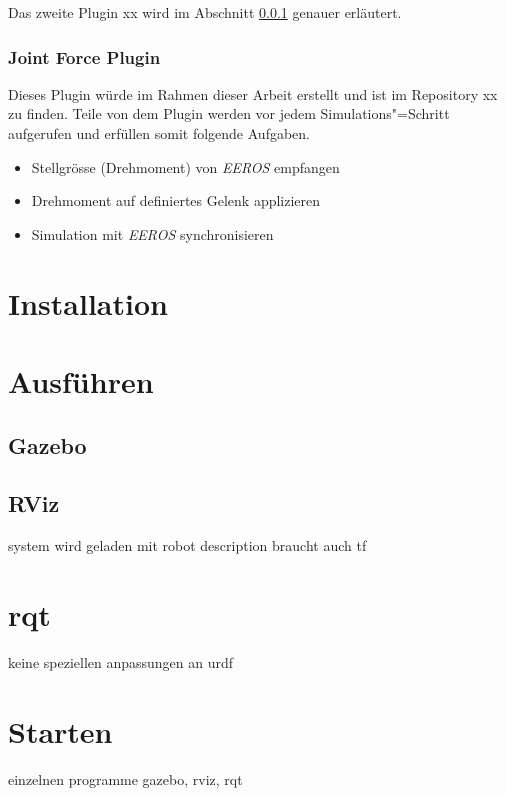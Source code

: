 Das zweite Plugin xx wird im Abschnitt \ref{chap:joint-force-plugin} genauer erläutert.

\subsubsection{Joint Force Plugin}
\label{chap:joint-force-plugin}
Dieses Plugin würde im Rahmen dieser Arbeit erstellt und ist im Repository xx zu finden.
Teile von dem Plugin werden vor jedem Simulations"=Schritt aufgerufen und erfüllen somit folgende Aufgaben.
\begin{itemize}
\item Stellgrösse (Drehmoment) von \textit{EEROS} empfangen
\item Drehmoment auf definiertes Gelenk applizieren
\item Simulation mit \textit{EEROS} synchronisieren
\end{itemize}

\section{Installation}


\section{Ausführen}
\subsection{Gazebo}

\subsection{RViz}
system wird geladen mit robot description
braucht auch tf

\section{rqt}
keine speziellen anpassungen an urdf 

\section{Starten}
einzelnen programme gazebo, rviz, rqt


